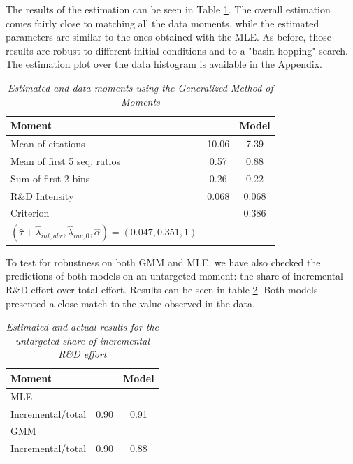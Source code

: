 \documentclass[letterpaper,12pt]{article}
\theoremstyle{definition}
\begin{document}
The results of the estimation can be seen in Table \ref{GMMTable}. The overall estimation comes fairly close to matching all the data moments, while the estimated parameters are similar to the ones obtained with the MLE. As before, those results are robust to different initial conditions and to a "basin hopping" search. The estimation plot over the data histogram is available in the Appendix.

\begin{table}[htbp] \centering \captionsetup{width=5.8in}
    \caption{\label{GMMTable}\textit{Estimated and data moments using the Generalized Method of Moments}}
	\centering
	\begin{tabular}{>{\small}l >{\small}c >{\small}c}
	\toprule
	Moment & \multicolumn{1}{c}{Data} & \multicolumn{1}{c}				{Model} \\ 
	\midrule
	Mean of citations & 10.06 & 7.39\\
	Mean of first 5 seq. ratios & 0.57 & 0.88\\
	Sum of first 2 bins & 0.26 & 0.22\\
	R\&D Intensity & 0.068 & 0.068\\
	Criterion & & 0.386\\
	\midrule
	$(\hat{\tau} + \hat{\lambda}_{int,abr}, \hat{\lambda}_{inc,0}, \hat{\alpha}) = (0.047, 0.351, 1)$\\
	\bottomrule
	\end{tabular}
\end{table}

To test for robustness on both GMM and MLE, we have also checked the predictions of both models on an untargeted moment: the share of incremental R\&D effort over total effort. Results can be seen in table \ref{Untarg}. Both models presented a close match to the value observed in the data.

\begin{table}[htbp] \centering \captionsetup{width=5.8in}
    \caption{\label{Untarg}\textit{Estimated and actual results for the untargeted share of incremental R\&D effort}}
	\centering
	\begin{tabular}{>{\small}l >{\small}c >{\small}c}
		\toprule
		Moment & \multicolumn{1}{c}{Data} & \multicolumn{1}{c}				{Model} \\ 
		\midrule
		MLE\\
		\;Incremental/total & 0.90 & 0.91\\
		GMM\\
		\;Incremental/total & 0.90 & 0.88\\
		\bottomrule
	\end{tabular}
\end{table}
\end{document}
